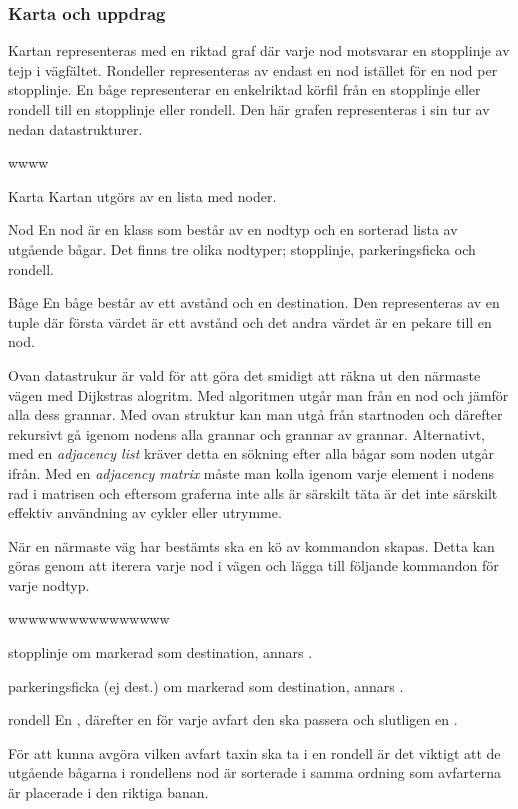 \documentclass[designspec/spec.tex]{subfiles}
\begin{document}
\subsubsection{Karta och uppdrag}
Kartan representeras med en riktad graf där varje nod motsvarar en stopplinje
av tejp i vägfältet. Rondeller representeras av endast en nod istället för en
nod per stopplinje. En båge representerar en enkelriktad körfil från en
stopplinje eller rondell till en stopplinje eller rondell. Den här grafen
representeras i sin tur av nedan datastrukturer.

\begin{labeling}{wwww}
    \item[Karta] Kartan utgörs av en lista med noder.

    \item[Nod] En nod är en klass som består av en nodtyp och en sorterad lista
        av utgående bågar. Det finns tre olika nodtyper; stopplinje,
        parkeringsficka och rondell. 

    \item[Båge] En båge består av ett avstånd och en destination. Den
        representeras av en tuple där första värdet är ett avstånd och det
        andra värdet är en pekare till en nod.
\end{labeling}

Ovan datastrukur är vald för att göra det smidigt att räkna ut den närmaste
vägen med Dijkstras alogritm. Med algoritmen utgår man från en nod och jämför
alla dess grannar. Med ovan struktur kan man utgå från startnoden och därefter
rekursivt gå igenom nodens alla grannar och grannar av grannar. Alternativt,
med en \textit{adjacency list} kräver detta en sökning efter alla bågar som
noden utgår ifrån. Med en \textit{adjacency matrix} måste man kolla igenom
varje element i nodens rad i matrisen och eftersom graferna inte alls är
särskilt täta är det inte särskilt effektiv användning av cykler eller utrymme. 

När en närmaste väg har bestämts ska en kö av kommandon skapas. Detta kan göras
genom att iterera varje nod i vägen och lägga till följande kommandon för varje
nodtyp.
\begin{labeling}{wwwwwwwwwwwwwwww}
\item[stopplinje]  om markerad som destination, annars
    .
\item[parkeringsficka (ej dest.)]  om markerad som destination,
    annars .
\item[rondell] En , därefter en  för varje avfart
    den ska passera och slutligen en .
\end{labeling}
För att kunna avgöra vilken avfart taxin ska ta i en rondell är det viktigt att
de utgående bågarna i rondellens nod är sorterade i samma ordning som
avfarterna är placerade i den riktiga banan.
\end{document}
